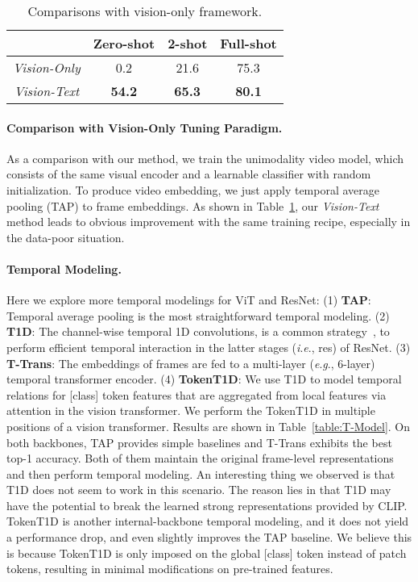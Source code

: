 \documentclass[letterpaper]{article} \usepackage{aaai23}  \usepackage{times}  \usepackage{helvet}  \usepackage{courier}  \usepackage[hyphens]{url}  \usepackage{graphicx} \urlstyle{rm} \def\UrlFont{\rm}  \usepackage{natbib}  \usepackage{caption} \frenchspacing  \setlength{\pdfpagewidth}{8.5in}  \setlength{\pdfpageheight}{11in}  \usepackage{algorithm}
\newcommand{\ie}{\textit{i}.\textit{e}.}
\newcommand{\eg}{\textit{e}.\textit{g}.}
\begin{document}
\begin{table}[t]
    \centering
  \begin{tabular}{cccc}
  \toprule
    & Zero-shot & 2-shot & Full-shot  \\ \midrule
  \emph{Vision-Only} & 0.2  & 21.6 & 75.3\\ 
  \emph{Vision-Text} & \textbf{54.2} &  \textbf{65.3} & \textbf{80.1}   \\ \bottomrule
   \end{tabular}
   \caption{Comparisons with vision-only framework.}
  \label{table:vs_vision}
\end{table}


\paragraph{Comparison with Vision-Only Tuning Paradigm.} 
As a comparison with our method, we train the unimodality video model, which consists of the same visual encoder and a learnable classifier with random initialization.
To produce video embedding, we just apply temporal average pooling (TAP) to frame embeddings.
As shown in Table~\ref{table:vs_vision}, our \emph{Vision-Text} method leads to obvious improvement with the same training recipe, especially in the data-poor situation.







\paragraph{Temporal Modeling.}
Here we explore more temporal modelings for ViT and ResNet:
(1) \textbf{TAP}: Temporal average pooling is the most straightforward temporal modeling.
(2) \textbf{T1D}: The channel-wise temporal 1D convolutions, is a common strategy~\cite{wu2020MVFNet,tdn,teinet}, to perform efficient temporal interaction in the latter stages (\ie, res) of ResNet.
(3) \textbf{T-Trans}: The embeddings of frames are fed to a multi-layer (\eg, 6-layer) temporal transformer encoder. 
(4) \textbf{TokenT1D}: We use T1D to model temporal relations for [class] token features that are aggregated from local features via attention in the vision transformer. We perform the TokenT1D in multiple positions of a vision transformer.
Results are shown in Table~\ref{table:T-Model}. 
On both backbones, TAP provides simple baselines and T-Trans exhibits the best top-1 accuracy. Both of them maintain the original frame-level representations and then perform temporal modeling.
An interesting thing we observed is that T1D does not seem to work in this scenario. The reason lies in that T1D may have the potential to break the learned strong representations provided by CLIP.
TokenT1D is another internal-backbone temporal modeling, and it does not yield a performance drop, and even slightly improves the TAP baseline.
We believe this is because TokenT1D is only imposed on the global [class] token instead of patch tokens, resulting in minimal modifications on pre-trained features.
\end{document}
